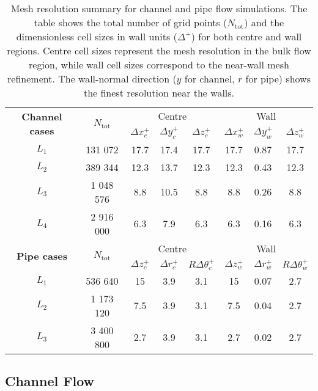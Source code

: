 \begingroup
\setlength{\tabcolsep}{8pt} %
\renewcommand{\arraystretch}{1.2} %
\begin{table}[ht]
\centering
\begin{tabular}{cccccccc}
\toprule
\multirow{2}{*}{\textbf{Channel cases}} & \multirow{2}{*}{$N_\text{tot}$} & \multicolumn{3}{c}{Centre} & \multicolumn{3}{c}{Wall} \\
\cmidrule(lr){3-5} \cmidrule(lr){6-8}
& & $\Delta x_c^+$ & $\Delta y_c^+$ & $\Delta z_c^+$ & $\Delta x_w^+$ & $\Delta y_w^+$ & $\Delta z_w^+$ \\
\midrule
$L_1$ & 131 072   & 17.7 & 17.4 & 17.7 & 17.7 & 0.87 & 17.7 \\
$L_2$ & 389 344   & 12.3 & 13.7 & 12.3 & 12.3 & 0.43 & 12.3 \\
$L_3$ & 1 048 576 & 8.8  & 10.5 & 8.8  & 8.8  & 0.26 & 8.8  \\
$L_4$ & 2 916 000 & 6.3  & 7.9  & 6.3  & 6.3  & 0.16 & 6.3  \\
\midrule
\multirow{2}{*}{\textbf{Pipe cases}} & \multirow{2}{*}{$N_\text{tot}$} & \multicolumn{3}{c}{Centre} & \multicolumn{3}{c}{Wall} \\
\cmidrule(lr){3-5} \cmidrule(lr){6-8}
& & $\Delta z_c^+$ & $\Delta r_c^+$ & $R \Delta \theta_c^+$ & $\Delta z_w^+$ & $\Delta r_w^+$ & $R \Delta \theta_w^+$ \\
\midrule
$L_1$ & 536 640   & 15   & 3.9  & 3.1  & 15   & 0.07 & 2.7  \\
$L_2$ & 1 173 120 & 7.5  & 3.9  & 3.1  & 7.5  & 0.04 & 2.7  \\
$L_3$ & 3 400 800 & 2.7  & 3.9  & 3.1  & 2.7  & 0.02 & 2.7  \\
\bottomrule
\end{tabular}
\vspace{1mm}
\caption{Mesh resolution summary for channel and pipe flow simulations. The table shows the total number of grid points ($N_\text{tot}$) and the dimensionless cell sizes in wall units ($\Delta^+$) for both centre and wall regions. Centre cell sizes represent the mesh resolution in the bulk flow region, while wall cell sizes correspond to the near-wall mesh refinement. The wall-normal direction ($y$ for channel, $r$ for pipe) shows the finest resolution near the walls.}
\label{tab:mesh_overview}
\end{table}
\endgroup



\subsection{Channel Flow}
\label{subsec:channel_flow}

